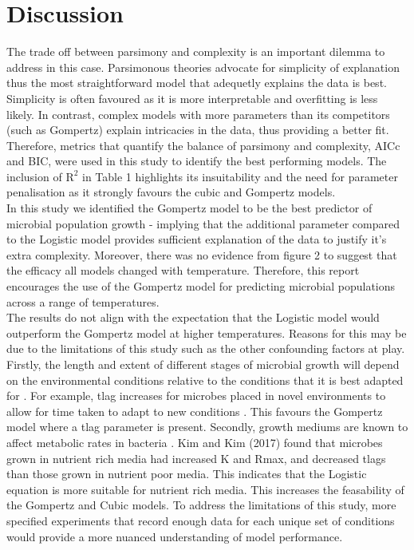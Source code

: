 \documentclass[12pt]{article}
\begin{document}
\section{Discussion}

The trade off between parsimony and complexity is an important dilemma to address in this case. Parsimonous theories advocate for simplicity of explanation \cite{Coelho2019} thus the most straightforward model that adequetly explains the data is best. Simplicity is often favoured as it is more interpretable and overfitting is less likely. In contrast, complex models with more parameters than its competitors (such as Gompertz) explain intricacies in the data, thus providing a better fit. Therefore, metrics that quantify the balance of parsimony and complexity, AICc and BIC, were used in this study to identify the best performing models. The inclusion of $\mathrm{R}^2$ in Table 1 highlights its insuitability and the need for parameter penalisation as it strongly favours the cubic and Gompertz models.\\

In this study we identified the Gompertz model to be the best predictor of microbial population growth - implying that the additional parameter compared to the Logistic model provides sufficient explanation of the data to justify it's extra complexity. Moreover, there was no evidence from figure 2 to suggest that the efficacy all models changed with temperature. Therefore, this report encourages the use of the Gompertz model for predicting microbial populations across a range of temperatures.\\

The results do not align with the expectation that the Logistic model would outperform the Gompertz model at higher temperatures. Reasons for this may be due to the limitations of this study such as the other confounding factors at play. Firstly, the length and extent of different stages of microbial growth will depend on the environmental conditions relative to the conditions that it is best adapted for \cite{Dey2020}. For example, tlag increases for microbes placed in novel environments to allow for time taken to adapt to new conditions \cite{Rolfe2012}. This favours the Gompertz model where a tlag parameter is present. Secondly, growth mediums are known to affect metabolic rates in bacteria \cite{KIM201764}. Kim and Kim (2017) found that microbes grown in nutrient rich media had increased K and Rmax, and decreased tlags than those grown in nutrient poor media. This indicates that the Logistic equation is more suitable for nutrient rich media.  This increases the feasability of the Gompertz and Cubic models. To address the limitations of this study, more specified experiments that record enough data for each unique set of conditions would provide a more nuanced understanding of model performance.\\
\end{document}
